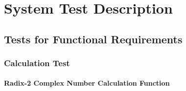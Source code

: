 \documentclass[12pt, titlepage]{article}
\begin{document}
\section{System Test Description}
	
\subsection{Tests for Functional Requirements}

\subsubsection{Calculation Test}
		
\paragraph{Radix-2 Complex Number Calculation Function\\}
\end{document}
